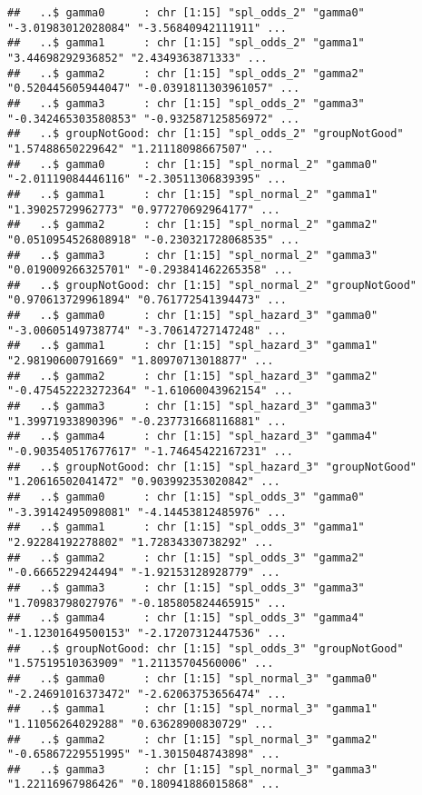 \documentclass[
]{article}
\begin{document}
\begin{verbatim}
##   ..$ gamma0      : chr [1:15] "spl_odds_2" "gamma0" "-3.01983012028084" "-3.56840942111911" ...
##   ..$ gamma1      : chr [1:15] "spl_odds_2" "gamma1" "3.44698292936852" "2.4349363871333" ...
##   ..$ gamma2      : chr [1:15] "spl_odds_2" "gamma2" "0.520445605944047" "-0.0391811303961057" ...
##   ..$ gamma3      : chr [1:15] "spl_odds_2" "gamma3" "-0.342465303580853" "-0.932587125856972" ...
##   ..$ groupNotGood: chr [1:15] "spl_odds_2" "groupNotGood" "1.57488650229642" "1.21118098667507" ...
##   ..$ gamma0      : chr [1:15] "spl_normal_2" "gamma0" "-2.01119084446116" "-2.30511306839395" ...
##   ..$ gamma1      : chr [1:15] "spl_normal_2" "gamma1" "1.39025729962773" "0.977270692964177" ...
##   ..$ gamma2      : chr [1:15] "spl_normal_2" "gamma2" "0.0510954526808918" "-0.230321728068535" ...
##   ..$ gamma3      : chr [1:15] "spl_normal_2" "gamma3" "0.019009266325701" "-0.293841462265358" ...
##   ..$ groupNotGood: chr [1:15] "spl_normal_2" "groupNotGood" "0.970613729961894" "0.761772541394473" ...
##   ..$ gamma0      : chr [1:15] "spl_hazard_3" "gamma0" "-3.00605149738774" "-3.70614727147248" ...
##   ..$ gamma1      : chr [1:15] "spl_hazard_3" "gamma1" "2.98190600791669" "1.80970713018877" ...
##   ..$ gamma2      : chr [1:15] "spl_hazard_3" "gamma2" "-0.475452223272364" "-1.61060043962154" ...
##   ..$ gamma3      : chr [1:15] "spl_hazard_3" "gamma3" "1.39971933890396" "-0.237731668116881" ...
##   ..$ gamma4      : chr [1:15] "spl_hazard_3" "gamma4" "-0.903540517677617" "-1.74645422167231" ...
##   ..$ groupNotGood: chr [1:15] "spl_hazard_3" "groupNotGood" "1.20616502041472" "0.903992353020842" ...
##   ..$ gamma0      : chr [1:15] "spl_odds_3" "gamma0" "-3.39142495098081" "-4.14453812485976" ...
##   ..$ gamma1      : chr [1:15] "spl_odds_3" "gamma1" "2.92284192278802" "1.72834330738292" ...
##   ..$ gamma2      : chr [1:15] "spl_odds_3" "gamma2" "-0.6665229424494" "-1.92153128928779" ...
##   ..$ gamma3      : chr [1:15] "spl_odds_3" "gamma3" "1.70983798027976" "-0.185805824465915" ...
##   ..$ gamma4      : chr [1:15] "spl_odds_3" "gamma4" "-1.12301649500153" "-2.17207312447536" ...
##   ..$ groupNotGood: chr [1:15] "spl_odds_3" "groupNotGood" "1.57519510363909" "1.21135704560006" ...
##   ..$ gamma0      : chr [1:15] "spl_normal_3" "gamma0" "-2.24691016373472" "-2.62063753656474" ...
##   ..$ gamma1      : chr [1:15] "spl_normal_3" "gamma1" "1.11056264029288" "0.63628900830729" ...
##   ..$ gamma2      : chr [1:15] "spl_normal_3" "gamma2" "-0.65867229551995" "-1.3015048743898" ...
##   ..$ gamma3      : chr [1:15] "spl_normal_3" "gamma3" "1.22116967986426" "0.180941886015868" ...

\end{verbatim}
\end{document}
